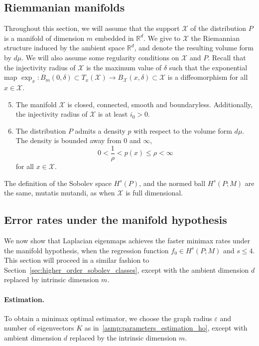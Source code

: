 \documentclass{article}
\newcommand{\Reals}{\mathbb{R}}
\newcommand{\1}{\mathbf{1}}
\newcommand{\Rd}{\Reals^d}
\newcommand{\mc}[1]{\mathcal{#1}}
\theoremstyle{alden}
\theoremstyle{aldenthm}
\theoremstyle{definition}
\theoremstyle{remark}
\begin{document}
\subsection{Riemmanian manifolds}
Throughout this section, we will assume that the support $\mc{X}$ of the distribution $P$ is a manifold of dimension $m$ embedded in $\Rd$. We give to $\mc{X}$ the Riemannian structure induced by the ambient space $\Rd$, and denote the resulting volume form by $d\mu$.  We will also assume some regularity conditions on $\mc{X}$ and $P$. Recall that the injectivity radius of $\mc{X}$ is the maximum value of $\delta$ such that the exponential map $\exp_x: B_m(0,\delta) \subset T_x(\mc{X}) \to B_{\mc{X}}(x,\delta) \subset \mc{X}$ is a diffeomorphism for all $x \in \mc{X}$.
\begin{enumerate}[label=(A\arabic*)]
	\setcounter{enumi}{4}
	\item 
	\label{asmp:domain_manifold} The manifold $\mc{X}$ is closed, connected, smooth and boundaryless. Additionally, the injectivity radius of $\mc{X}$ is at least $i_0 > 0$.
	\item 
	\label{asmp:density_manifold} The distribution $P$ admits a density $p$ with respect to the volume form $d\mu$. The density is bounded away from $0$ and $\infty$,
	\begin{equation*}
	0 < \frac{1}{\rho} < p(x) \leq \rho < \infty
	\end{equation*}
	for all $x \in \mc{X}$.
\end{enumerate}
The definition of the Sobolev space $H^s(P)$, and the normed ball $H^s(P;M)$ are the same, mutatis mutandi, as when $\mc{X}$ is full dimensional. 

\subsection{Error rates under the manifold hypothesis}
We now show that Laplacian eigenmaps achieves the faster minimax rates under the manifold hypothesis, when the regression function $f_0 \in H^s(P;M)$ and $s \leq 4$. This section will proceed in a similar fashion to Section~\ref{sec:higher_order_sobolev_classes}, except with the ambient dimension $d$ replaced by intrinsic dimension $m$. 

\paragraph{Estimation.}
To obtain a minimax optimal estimator, we choose the graph radius $\varepsilon$ and number of eigenvectors $K$ as in~\ref{asmp:parameters_estimation_ho}, except with ambient dimension $d$ replaced by the intrinsic dimension $m$.
\end{document}
